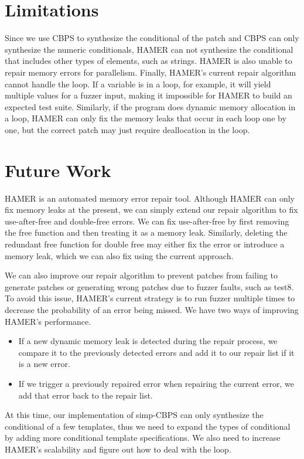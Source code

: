 \documentclass[a4paper,11pt,oneside,openany]{book}
\begin{document}
\section{Limitations}
Since we use CBPS to synthesize the conditional of the patch and CBPS can only synthesize the numeric conditionals, HAMER can not synthesize the conditional that includes other types of elements, such as strings. HAMER is also unable to repair memory errors for parallelism. Finally, HAMER's current repair algorithm cannot handle the loop. If a variable is in a loop, for example, it will yield multiple values for a fuzzer input, making it impossible for HAMER to build an expected test suite. Similarly, if the program does dynamic memory allocation in a loop, HAMER can only fix the memory leaks that occur in each loop one by one, but the correct patch may just require deallocation in the loop.
\section{Future Work}
HAMER is an automated memory error repair tool. Although HAMER can only fix memory leaks at the present, we can simply extend our repair algorithm to fix use-after-free and double-free errors. We can fix use-after-free by first removing the free function and then treating it as a memory leak. Similarly, deleting the redundant free function for double free may either fix the error or introduce a memory leak, which we can also fix using the current approach.

We can also improve our repair algorithm to prevent patches from failing to generate patches or generating wrong patches due to fuzzer faults, such as test8. To avoid this issue, HAMER's current strategy is to run fuzzer multiple times to decrease the probability of an error being missed. We have two ways of improving HAMER's performance.
\begin{itemize}
\item If a new dynamic memory leak is detected during the repair process, we compare it to the previously detected errors and add it to our repair list if it is a new error.
\item If we trigger a previously repaired error when repairing the current error, we add that error back to the repair list.
\end{itemize}

At this time, our implementation of simp-CBPS can only synthesize the conditional of a few templates, thus we need to expand the types of conditional by adding more conditional template specifications. We also need to increase HAMER's scalability and figure out how to deal with the loop.











\end{document}
